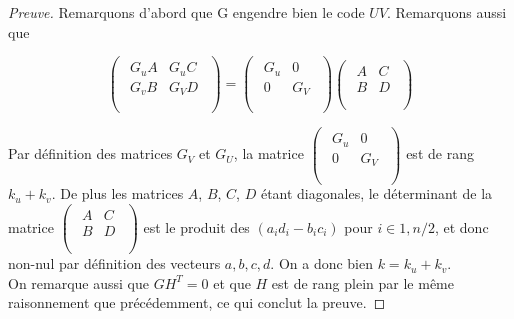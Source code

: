 \documentclass[12pt]{article}
\theoremstyle{definition}
\begin{document}
\begin{proof}[Preuve]
Remarquons d'abord que G engendre bien le code $UV$. Remarquons aussi que 

$$
\begin{pmatrix}
\begin{array}{c|c}
G_uA & G_uC \\
 \hline 
G_vB & G_VD \\
\end{array} \\
\end{pmatrix}
= 
\begin{pmatrix}
\begin{array}{c|c}
G_u & 0 \\
 \hline 
0 & G_V \\
\end{array} \\
\end{pmatrix} 
\begin{pmatrix}
\begin{array}{c|c}
A & C \\
 \hline 
B & D \\
\end{array} \\
\end{pmatrix}
$$

Par définition des matrices $G_V$ et $G_U$, la matrice $ 
\begin{pmatrix}
\begin{array}{c|c}
G_u & 0 \\
 \hline 
0 & G_V \\
\end{array} \\
\end{pmatrix} $ est de rang $k_u + k_v$. De plus les matrices $A$, $B$, $C$, $D$ étant diagonales, le déterminant de la matrice $\begin{pmatrix}
\begin{array}{c|c}
A & C \\
 \hline 
B & D \\
\end{array} \\
\end{pmatrix}$
est le produit des $(a_id_i - b_ic_i)$ pour $i \in {1, n/2}$, et donc non-nul par définition des vecteurs $a,b,c,d$. On a donc bien $k = k_u + k_v$. \\
On remarque aussi que $GH^T = 0$ et que $H$ est de rang plein par le même raisonnement que précédemment, ce qui conclut la preuve.
\end{proof}
\end{document}
